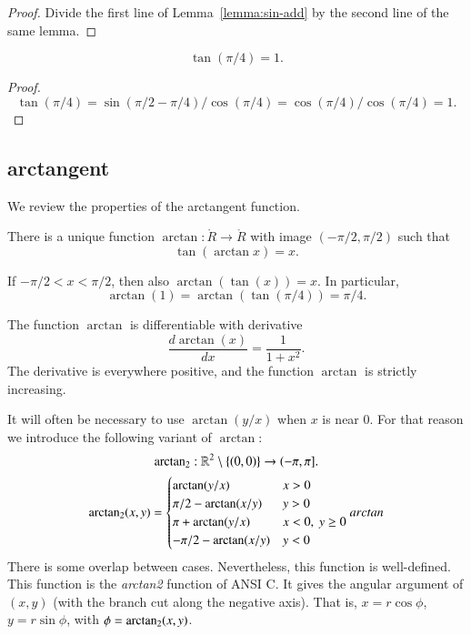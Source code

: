\begin{proof}
  Divide the first line of Lemma~\ref{lemma:sin-add} by the second
  line of the same lemma.
\end{proof}

\begin{lemma}\label{lemma:tan-pi4}
    $$\tan(\pi/4) = 1.$$
\end{lemma}

\begin{proof}
    $$\tan(\pi/4) = \sin(\pi/2-\pi/4)/\cos(\pi/4) =
    \cos(\pi/4)/\cos(\pi/4) = 1.$$
\end{proof}


\subsection{arctangent}

We review the properties of the arctangent function.

\begin{definition}[arctangent]\label{def:arctan}
There is a unique function $\arctan:\ring{R}\to\ring{R}$ with
image $(-\pi/2,\pi/2)$ such that
    $$\tan(\arctan x) =x.$$
\end{definition}

If $-\pi/2 < x < \pi/2$, then also $\arctan(\tan(x)) = x$. In
particular,
    $$\arctan(1) = \arctan(\tan(\pi/4)) = \pi/4.$$


The function $\arctan$ is differentiable with derivative%
    $$\frac{d \arctan(x)}{dx} = \frac{1}{1 + x^2}.$$
The derivative is everywhere positive, and the function $\arctan$ is
strictly increasing.


It will often be necessary to use $\arctan(y/x)$ when $x$ is near $0$.
For that reason we introduce the following variant of $\arctan$:
$$
{\operatorname{arctan_2}}: \mathbb{R}^2\setminus\{(0,0)\} \to (-\pi,\pi].
$$
$$
\atn(x,y) = \begin{cases}
   \arctan(y/x) & x > 0\\
   \pi/2- \arctan(x/y) & y > 0 \\
   \pi + \arctan(y/x) & x< 0,\  y\ge 0\\
   -\pi/2- \arctan(x/y) & y< 0 \\
\end{cases}
\index{Index}{arctan}
$$
There is some overlap between cases. Nevertheless, 
this function is well-defined.  
This function is the {\it arctan2} function of ANSI C.  It gives the
angular argument of $(x,y)$ (with the branch cut along the negative axis).
That is, $x = r\cos\phi$, $y=r\sin\phi$, with $\phi={\operatorname{arctan_2}}(x,y)$.


